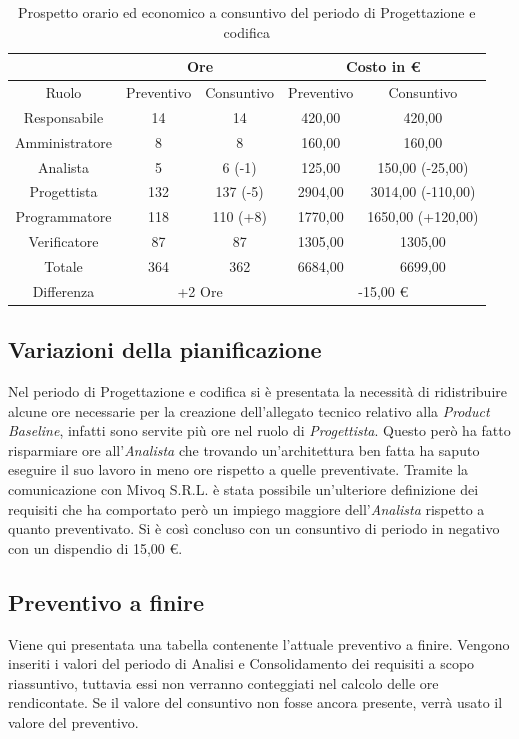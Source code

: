 \documentclass[./PianodiProgetto.tex]{subfiles}
\begin{document}
\begin{table}[H]
	\centering
	\begin{tabular}{|c|c|c|c|c|}
		\hline
		& \multicolumn{2}{c|}{Ore} & \multicolumn{2}{c|}{Costo in \euro{}}  \\ \hline
		Ruolo&Preventivo&Consuntivo&Preventivo&Consuntivo \\ \hline
		Responsabile&14&14&420,00&420,00 \\ \hline
		Amministratore&8&8&160,00&160,00 \\ \hline
		Analista&5&6 (-1)&125,00&150,00 (-25,00)\\ \hline
		Progettista&132&137 (-5)&2904,00&3014,00 (-110,00) \\ \hline
		Programmatore&118&110 (+8)&1770,00&1650,00 (+120,00) \\ \hline
		Verificatore&87&87&1305,00&1305,00 \\ \hline
		Totale&364&362&6684,00&6699,00 \\ \hline
		Differenza& \multicolumn{2}{c|}{+2 Ore} & \multicolumn{2}{c|}{-15,00 \euro{}} \\ \hline
	\end{tabular}
	\caption{Prospetto orario ed economico a consuntivo del periodo di Progettazione e codifica}
\end{table}

\subsection{Variazioni della pianificazione}
Nel periodo di Progettazione e codifica si è presentata la necessità di ridistribuire alcune ore necessarie per la creazione dell'allegato tecnico relativo alla \textit{Product Baseline}, infatti sono servite più ore nel ruolo di \textit{Progettista}. Questo però ha fatto risparmiare ore all'\textit{Analista} che trovando un'architettura ben fatta ha saputo eseguire il suo lavoro in meno ore rispetto a quelle preventivate. 
Tramite la comunicazione con Mivoq S.R.L. è stata possibile un'ulteriore definizione dei requisiti che ha comportato però un impiego maggiore dell'\textit{Analista} rispetto a quanto preventivato. 
Si è così concluso con un consuntivo di periodo in negativo con un dispendio di 15,00 \euro{}.

\subsection{Preventivo a finire}
Viene qui presentata una tabella contenente l'attuale preventivo a finire.
Vengono inseriti i valori del periodo di Analisi e Consolidamento dei requisiti a scopo riassuntivo, tuttavia essi non verranno conteggiati nel calcolo delle ore rendicontate. Se il valore del consuntivo non fosse ancora presente, verrà usato il valore del preventivo.
\end{document}
